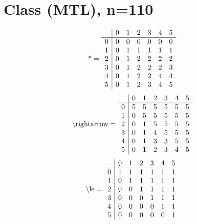 \documentclass[11pt]{article}
\begin{document}
\section{Class (MTL), n=110}
\[\text{*} = 
\begin{array}{r | r r r r r r}
 & 0 & 1 & 2 & 3 & 4 & 5 \\ \hline
0 & 0 & 0 & 0 & 0 & 0 & 0 \\
1 & 0 & 1 & 1 & 1 & 1 & 1 \\
2 & 0 & 1 & 2 & 2 & 2 & 2 \\
3 & 0 & 1 & 2 & 2 & 2 & 3 \\
4 & 0 & 1 & 2 & 2 & 4 & 4 \\
5 & 0 & 1 & 2 & 3 & 4 & 5 \\
\end{array}
\]
\[\text{\textbackslash rightarrow} = 
\begin{array}{r | r r r r r r}
 & 0 & 1 & 2 & 3 & 4 & 5 \\ \hline
0 & 5 & 5 & 5 & 5 & 5 & 5 \\
1 & 0 & 5 & 5 & 5 & 5 & 5 \\
2 & 0 & 1 & 5 & 5 & 5 & 5 \\
3 & 0 & 1 & 4 & 5 & 5 & 5 \\
4 & 0 & 1 & 3 & 3 & 5 & 5 \\
5 & 0 & 1 & 2 & 3 & 4 & 5 \\
\end{array}
\]
\[\text{\textbackslash le} = 
\begin{array}{r | r r r r r r}
 & 0 & 1 & 2 & 3 & 4 & 5 \\ \hline
0 & 1 & 1 & 1 & 1 & 1 & 1 \\
1 & 0 & 1 & 1 & 1 & 1 & 1 \\
2 & 0 & 0 & 1 & 1 & 1 & 1 \\
3 & 0 & 0 & 0 & 1 & 1 & 1 \\
4 & 0 & 0 & 0 & 0 & 1 & 1 \\
5 & 0 & 0 & 0 & 0 & 0 & 1 \\
\end{array}
\]
\end{document}
